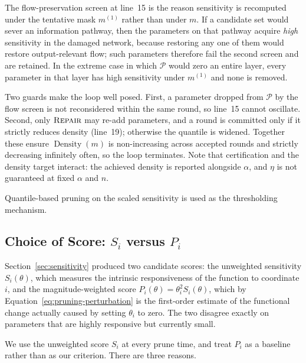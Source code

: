 \documentclass{article}
\theoremstyle{definition}
\theoremstyle{remark}
\begin{document}
The flow-preservation screen at line~15 is the reason sensitivity is recomputed
under the tentative mask $m^{(1)}$ rather than under $m$. If a candidate set
would sever an information pathway, then the parameters on that pathway acquire
\emph{high} sensitivity in the damaged network, because restoring any one of
them would restore output-relevant flow; such parameters therefore fail the
second screen and are retained. In the extreme case in which $\mathcal P$ would
zero an entire layer, every parameter in that layer has high sensitivity under
$m^{(1)}$ and none is removed.

Two guards make the loop well posed. First, a parameter dropped from
$\mathcal P$ by the flow screen is not reconsidered within the same round, so
line~15 cannot oscillate. Second, only $\textsc{Repair}$ may re-add parameters,
and a round is committed only if it strictly reduces density (line~19);
otherwise the quantile is widened. Together these ensure
$\operatorname{Density}(m)$ is non-increasing across accepted rounds and
strictly decreasing infinitely often, so the loop terminates. Note that
certification and the density target interact: the achieved density is reported
alongside $\alpha$, and $\eta$ is not guaranteed at fixed $\alpha$ and $n$.


Quantile-based pruning on the scaled sensitivity is used as the thresholding mechanism.

\subsection{Choice of Score: $S_i$ versus $P_i$}
\label{subsec:score-choice}

Section~\ref{sec:sensitivity} produced two candidate scores: the unweighted
sensitivity $S_i(\theta)$, which measures the intrinsic responsiveness of the
function to coordinate $i$, and the magnitude-weighted score
$P_i(\theta)=\theta_i^2S_i(\theta)$, which by
Equation~\eqref{eq:pruning-perturbation} is the first-order estimate of the
functional change actually caused by setting $\theta_i$ to zero. The two
disagree exactly on parameters that are highly responsive but currently small.

We use the unweighted score $S_i$ at every prune time, and treat $P_i$ as a
baseline rather than as our criterion. There are three reasons.
\end{document}

